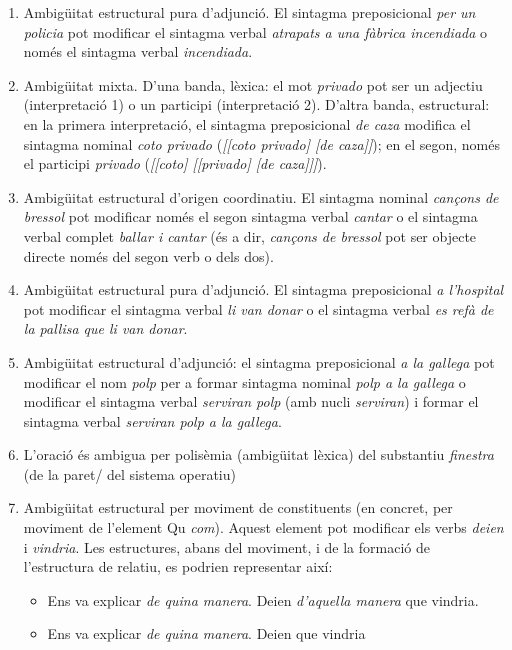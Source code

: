 \begin{enumerate}
\begin{enumerate}
      \item Ambigüitat estructural pura d'adjunció. El sintagma
        preposicional \emph{per un policia} pot modificar el sintagma
        verbal \emph{atrapats a una fàbrica incendiada} o només el
        sintagma verbal \emph{incendiada}.
      \item Ambigüitat mixta. D'una banda,
        lèxica: el mot \emph{privado} pot ser un adjectiu
        (interpretació 1) o un participi (interpretació 2). D'altra
        banda, estructural: en la primera interpretació, el sintagma
        preposicional \emph{de caza} modifica el sintagma nominal
        \emph{coto privado} (\emph{[[coto privado] [de caza]]}); en el
        segon, només el participi \emph{privado} (\emph{[[coto]
          [[privado] [de caza]]]}).
    \item  Ambigüitat
      estructural d'origen coordinatiu. El sintagma nominal 
      \emph{cançons de bressol} pot modificar només el segon 
     sintagma verbal \emph{cantar} o el sintagma verbal complet
     \emph{ballar i cantar} (és a dir, \emph{cançons de bressol} pot
     ser objecte directe només del segon verb o dels dos).
      \item Ambigüitat estructural pura d'adjunció. El sintagma
      preposicional \emph{a l'hospital} pot modificar el sintagma
      verbal \emph{li van donar}  o el sintagma verbal \emph{es refà de
      la pallisa que li van donar}.
  \item Ambigüitat estructural d'adjunció: el sintagma preposicional
    \emph{a la gallega} pot modificar el nom \emph{polp} per a formar
    sintagma nominal \emph{polp a la gallega} o modificar el sintagma
    verbal \emph{serviran polp} (amb nucli \emph{serviran}) i formar
    el sintagma verbal \emph{serviran polp a la gallega}. 
  \item L'oració és ambigua per polisèmia (ambigüitat lèxica) del
    substantiu  \emph{finestra} (de la paret/ del sistema operatiu)
  \item Ambigüitat estructural per moviment de constituents (en
    concret, per moviment de l'element Qu \emph{com}). Aquest element
    pot modificar els verbs \emph{deien} i \emph{vindria}.  Les
    estructures, abans del moviment, i de la formació de l'estructura
    de relatiu, es podrien representar així:
    \begin{itemize}
    \item Ens va explicar \emph{de quina manera}. Deien \emph{d'aquella
      manera} que vindria.
  \item Ens va explicar \emph{de quina manera}. Deien que vindria

\end{itemize}
\end{enumerate}
\end{enumerate}
